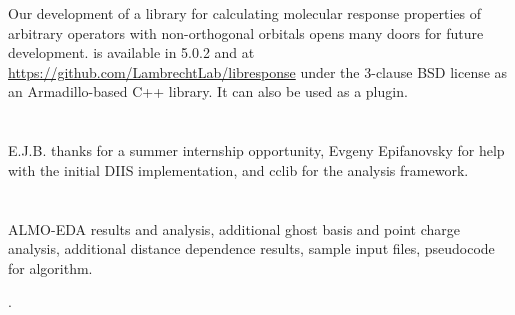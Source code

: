 \documentclass[%
  class = book,%
  crop = false,%
  float = true,%
  multi = true,%
  preview = false,%
]{standalone}
\begin{document}
Our development of a library for calculating molecular response properties of arbitrary operators with non-orthogonal orbitals opens many doors for future development. \libresponse{} is available in \qchem{} 5.0.2 and at \url{https://github.com/LambrechtLab/libresponse} under the 3-clause BSD license as an Armadillo-based\cite{armadillo} C++ library. It can also be used as a \psif{}\cite{Psi41.1} plugin.

\section{\texorpdfstring{}{Acknowledgements}}

E.J.B. thanks \qchem{} for a summer internship opportunity, Evgeny Epifanovsky for help with the initial DIIS implementation, and cclib\cite{OBoyle:2008cc,eric_berquist_2016_60670} for the analysis framework.

\section{\texorpdfstring{}{Supporting Information}}

ALMO-EDA results and analysis, additional ghost basis and point charge analysis, additional distance dependence results, sample input files, pseudocode for algorithm.

\begin{table}
  \centering
  \caption[ALMO-EDA results for argon\textemdash{}lithium cation dimer]{ALMO-EDA results. Energy units are \si{\kcal\per\mol}. All calculations used \hf{} with a bond length of \SI{2.4297}{\angstrom}.}
  \label{tab:almo-eda-results}
  \IfStandalone{}{}
\end{table}

\begin{table}
  \centering
  \caption{Analysis of ALMO-EDA terms from table~\ref{tab:almo-eda-results}.}.
  \label{tab:almo-eda-results-percentages}
  \IfStandalone{}{}
\end{table}

\begin{table}
  \centering
  \caption[Point charge and ghost function polarizability analysis]{Percentage of supermolecular result for point charge and ghost function polarizabilities. All calculations used \hf{} with canonical MOs and a distance of \SI{2.4297}{\angstrom} from argon to the other center(s).}
  \label{tab:basis-set-dependence-percentages}
  \IfStandalone{}{}
\end{table}
\end{document}
